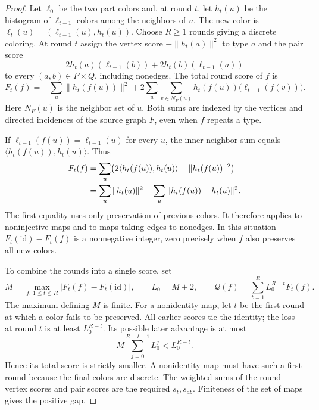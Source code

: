 \begin{proof}
Let $\ell_0$ be the two part colors and, at round $t$, let $h_t(u)$
be the histogram of $\ell_{t-1}$-colors among the neighbors of $u$.
The new color is $\ell_t(u)=(\ell_{t-1}(u),h_t(u))$. Choose $R\ge1$
rounds giving a discrete coloring. At round $t$ assign the vertex score
$-\|h_t(a)\|^2$ to type $a$ and the pair score
\[
 2h_t(a)(\ell_{t-1}(b))+2h_t(b)(\ell_{t-1}(a))
\]
to every $(a,b)\in P\times Q$, including nonedges. The total round
score of \(f\) is
\[
 F_t(f)=-\sum_u\|h_t(f(u))\|^2
 +2\sum_u\sum_{v\in N_F(u)}
     h_t(f(u))\bigl(\ell_{t-1}(f(v))\bigr).
\]
Here \(N_F(u)\) is the neighbor set of \(u\). Both sums are indexed
by the vertices and directed incidences of the source graph \(F\),
even when \(f\) repeats a type.

If $\ell_{t-1}(f(u))=\ell_{t-1}(u)$ for every $u$, the inner
neighbor sum equals $\langle h_t(f(u)),h_t(u)\rangle$. Thus
\begin{align}
 F_t(f)
 &=\sum_u\bigl(2\langle h_t(f(u)),h_t(u)\rangle
                   -\|h_t(f(u))\|^2\bigr)\notag\\
 &=\sum_u\|h_t(u)\|^2
       -\sum_u\|h_t(f(u))-h_t(u)\|^2.
 \label{eq:kernel-pinning-square}
\end{align}
The first equality uses only preservation of previous colors. It
therefore applies to noninjective maps and to maps taking edges to
nonedges. In this situation $F_t(\mathrm{id})-F_t(f)$ is a nonnegative
integer, zero precisely when $f$ also preserves all new colors.

To combine the rounds into a single score, set
\[
 M=\max_{f,\,1\le t\le R}|F_t(f)-F_t(\mathrm{id})|,
 \qquad L_0=M+2,
 \qquad \mathcal Q(f)=\sum_{t=1}^R L_0^{R-t}F_t(f).
\]
The maximum defining $M$ is finite. For a nonidentity map, let $t$
be the first round at which a color fails to be preserved. All
earlier scores tie the identity; the loss at round $t$ is at least
$L_0^{R-t}$. Its possible later advantage is at most
\[
 M\sum_{j=0}^{R-t-1}L_0^j<L_0^{R-t}.
\]
Hence its total score is strictly smaller. A nonidentity map must
have such a first round because the final colors are discrete.
The weighted sums of the round vertex scores and pair scores are the
required $s_t,s_{ab}$. Finiteness of the set of maps gives the positive
gap.
\end{proof}

